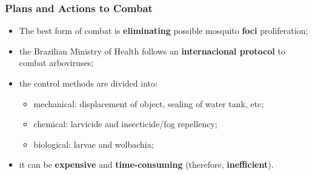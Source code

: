 \documentclass{beamer}
\begin{document}
	\begin{frame}
		\frametitle{Plans and Actions to Combat}

		\begin{itemize}
			\item The best form of combat is {\bf eliminating} possible mosquito {\bf foci} proliferation;
			\item the Brazilian Ministry of Health follows an \textbf{internacional protocol} to combat arboviruses;%
			\item the control methods are divided into:
			\begin{itemize}
				\item mechanical: displacement of object, sealing of water tank, etc;
				\item chemical: larvicide and insecticide/fog repellency;
				\item biological: larvae and wolbachia;
			\end{itemize}
			\item it can be {\bf expensive} and {\bf time-consuming} (therefore, {\bf inefficient}).
		\end{itemize}
	\end{frame}
\end{document}
